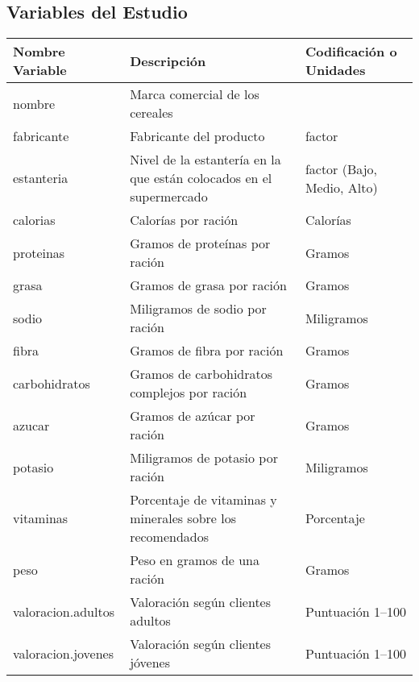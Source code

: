 \documentclass[a4paper,titlepage]{article}
\begin{document}
\subsection*{\color{blueceu}Variables del Estudio}
\begin{center}
\begin{tabular}{|l|p{7cm}|l|}
	\hline
	Nombre Variable    & Descripción                                                        & Codificación o Unidades    \\ \hline\hline
	nombre             & Marca comercial de los cereales                                    &  \\
	fabricante         & Fabricante del producto                                            & factor                     \\
	estanteria         & Nivel de la estantería en la que están colocados en el supermercado & factor (Bajo, Medio, Alto) \\
	calorias           & Calorías por ración                                                & Calorías                   \\
	proteinas          & Gramos de proteínas por ración                                     & Gramos                     \\
	grasa              & Gramos de grasa por ración                                         & Gramos                     \\
	sodio              & Miligramos de sodio por ración                                     & Miligramos                 \\
	fibra              & Gramos de fibra por ración                                         & Gramos                     \\
	carbohidratos      & Gramos de carbohidratos complejos por ración                       & Gramos                     \\
	azucar             & Gramos de azúcar por ración                                        & Gramos                     \\
	potasio            & Miligramos de potasio por ración                                   & Miligramos                 \\
	vitaminas          & Porcentaje de vitaminas y minerales sobre los recomendados         & Porcentaje                 \\
	peso               & Peso en gramos de una ración                                       & Gramos                     \\
	valoracion.adultos & Valoración según clientes adultos                                  & Puntuación 1--100          \\
	valoracion.jovenes & Valoración según clientes jóvenes                                  & Puntuación 1--100          \\ \hline
\end{tabular}
\end{center}
\end{document}
